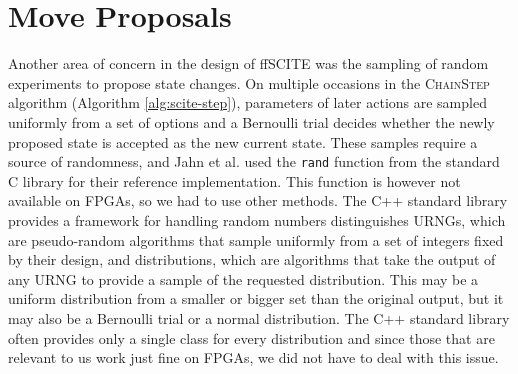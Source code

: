 \section{Move Proposals}
\label{sec:move_proposal}

Another area of concern in the design of \ac{ffSCITE} was the sampling of random experiments to propose state changes. On multiple occasions in the \textsc{ChainStep} algorithm (Algorithm \ref{alg:scite-step}), parameters of later actions are sampled uniformly from a set of options and a Bernoulli trial decides whether the newly proposed state is accepted as the new current state. These samples require a source of randomness, and Jahn et al. \cite{tree2016} used the \texttt{rand} function from the standard C library for their reference implementation. This function is however not available on \acp{FPGA}, so we had to use other methods. The C++ standard library provides a framework for handling random numbers distinguishes \acp{URNG}, which are pseudo-random algorithms that sample uniformly from a set of integers fixed by their design, and distributions, which are algorithms that take the output of any \ac{URNG} to provide a sample of the requested distribution. This may be a uniform distribution from a smaller or bigger set than the original output, but it may also be a Bernoulli trial or a normal distribution. The C++ standard library often provides only a single class for every distribution and since those that are relevant to us work just fine on \acp{FPGA}, we did not have to deal with this issue.

